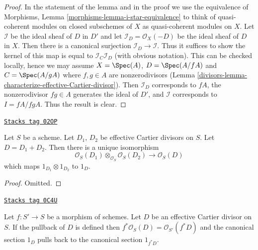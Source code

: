 \begin{proof}

In the statement of the lemma and in the proof we use the equivalence of
Morphisms, Lemma \ref{morphisms-lemma-i-star-equivalence} to think of
quasi-coherent modules on closed subschemes of $X$
as quasi-coherent modules on $X$. Let $\mathcal{I}$ be the ideal
sheaf of $D$ in $D'$ and let $\mathcal{I}_D = \mathcal{O}_X(-D)$ be
the ideal sheaf of $D$ in $X$. Then there is a canonical surjection
$\mathcal{I}_D \to \mathcal{I}$.
Thus it suffices to show the kernel of this map is equal to
$\mathcal{I}_C\mathcal{I}_D$ (with obvious notation).
This can be checked locally, hence we may assume
$X = \Spec(A)$, $D = \Spec(A/fA)$ and $C = \Spec(A/gA)$ where
$f, g \in A$ are nonzerodivisors
(Lemma \ref{divisors-lemma-characterize-effective-Cartier-divisor}).
Then $\mathcal{I}_D$ corresponds to $fA$, the nonzerodivisor $fg \in A$
generates the ideal of $D'$, and $\mathcal{I}$ corresponds to $I = fA/fgA$.
Thus the result is clear.
\end{proof}

\begin{lemma}
\label{divisors-lemma-invertible-sheaf-sum-effective-Cartier-divisors}
\href{https://stacks.math.columbia.edu/tag/02OP}{\texttt{Stacks tag 02OP}}

Let $S$ be a scheme.
Let $D_1$, $D_2$ be effective Cartier divisors on $S$.
Let $D = D_1 + D_2$.
Then there is a unique isomorphism
$$
\mathcal{O}_S(D_1) \otimes_{\mathcal{O}_S} \mathcal{O}_S(D_2)
\longrightarrow
\mathcal{O}_S(D)
$$
which maps $1_{D_1} \otimes 1_{D_2}$ to $1_D$.
\end{lemma}

\begin{proof}
Omitted.
\end{proof}

\begin{lemma}
\label{divisors-lemma-pullback-effective-Cartier-divisors}
\href{https://stacks.math.columbia.edu/tag/0C4U}{\texttt{Stacks tag 0C4U}}

Let $f : S' \to S$ be a morphism of schemes.
Let $D$ be an effective Cartier divisor on $S$.
If the pullback of $D$ is defined then
$f^*\mathcal{O}_S(D) = \mathcal{O}_{S'}(f^*D)$
and the canonical section $1_D$ pulls back to
the canonical section $1_{f^*D}$.
\end{lemma}

